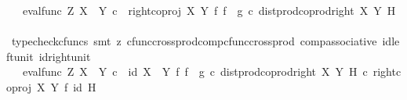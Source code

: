 \begin{isabellebody}
\ {\isachardoublequoteopen}{\isachardot}{\kern0pt}{\isachardot}{\kern0pt}{\isachardot}{\kern0pt}\ {\isacharequal}{\kern0pt}\ {\isacharparenleft}{\kern0pt}eval{\isacharunderscore}{\kern0pt}func\ Z\ {\isacharparenleft}{\kern0pt}X\ {\isasymCoprod}\ Y{\isacharparenright}{\kern0pt}\ {\isasymcirc}\isactrlsub c\ \ {\isacharparenleft}{\kern0pt}right{\isacharunderscore}{\kern0pt}coproj\ X\ Y\ {\isasymtimes}\isactrlsub f\ {\isacharparenleft}{\kern0pt}f\isactrlsup {\isasymflat}\ {\isasymamalg}\ g\isactrlsup {\isasymflat}\ {\isasymcirc}\isactrlsub c\ dist{\isacharunderscore}{\kern0pt}prod{\isacharunderscore}{\kern0pt}coprod{\isacharunderscore}{\kern0pt}right\ X\ Y\ H{\isacharparenright}{\kern0pt}\isactrlsup {\isasymsharp}{\isacharparenright}{\kern0pt}{\isacharparenright}{\kern0pt}\isactrlsup {\isasymsharp}{\isachardoublequoteclose}\isanewline
\ \ \ \ \ \ \ \ \isamarkupfalse%
\ {\isacharparenleft}{\kern0pt}typecheck{\isacharunderscore}{\kern0pt}cfuncs{\isacharcomma}{\kern0pt}\ smt\ {\isacharparenleft}{\kern0pt}z{}{\isacharparenright}{\kern0pt}\ cfunc{\isacharunderscore}{\kern0pt}cross{\isacharunderscore}{\kern0pt}prod{\isacharunderscore}{\kern0pt}comp{\isacharunderscore}{\kern0pt}cfunc{\isacharunderscore}{\kern0pt}cross{\isacharunderscore}{\kern0pt}prod\ comp{\isacharunderscore}{\kern0pt}associative{}\ id{\isacharunderscore}{\kern0pt}left{\isacharunderscore}{\kern0pt}unit{}\ id{\isacharunderscore}{\kern0pt}right{\isacharunderscore}{\kern0pt}unit{}{\isacharparenright}{\kern0pt}\isanewline
\ \ \ \ \ \ \isamarkupfalse%
\ \isamarkupfalse%
\ {\isachardoublequoteopen}{\isachardot}{\kern0pt}{\isachardot}{\kern0pt}{\isachardot}{\kern0pt}\ {\isacharequal}{\kern0pt}\ {\isacharparenleft}{\kern0pt}eval{\isacharunderscore}{\kern0pt}func\ Z\ {\isacharparenleft}{\kern0pt}X\ {\isasymCoprod}\ Y{\isacharparenright}{\kern0pt}\ {\isasymcirc}\isactrlsub c\ \ {\isacharparenleft}{\kern0pt}id\ {\isacharparenleft}{\kern0pt}X\ {\isasymCoprod}\ Y{\isacharparenright}{\kern0pt}\ {\isasymtimes}\isactrlsub f\ {\isacharparenleft}{\kern0pt}f\isactrlsup {\isasymflat}\ {\isasymamalg}\ g\isactrlsup {\isasymflat}\ {\isasymcirc}\isactrlsub c\ dist{\isacharunderscore}{\kern0pt}prod{\isacharunderscore}{\kern0pt}coprod{\isacharunderscore}{\kern0pt}right\ X\ Y\ H{\isacharparenright}{\kern0pt}\isactrlsup {\isasymsharp}{\isacharparenright}{\kern0pt}\ {\isasymcirc}\isactrlsub c\ {\isacharparenleft}{\kern0pt}right{\isacharunderscore}{\kern0pt}coproj\ X\ Y\ {\isasymtimes}\isactrlsub f\ id\ H{\isacharparenright}{\kern0pt}{\isacharparenright}{\kern0pt}\isactrlsup {\isasymsharp}{\isachardoublequoteclose}\isanewline

\end{isabellebody}
